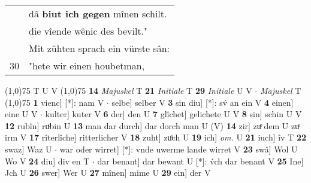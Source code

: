 \documentclass[8pt,a4paper,notitlepage]{article}
\begin{document}
\begin{table}[ht]
\begin{minipage}[t]{0.5\linewidth}
\begin{tabular}{rl}
 & dâ \textbf{biut ich gegen} mînen schilt.\\ 
 & die vîende wênic des bevilt."\\ 
 & Mit zühten sprach ein vürste sân:\\ 
30 & "hete wir einen houbetman,\\ 
\end{tabular}
\scriptsize
\line(1,0){75} \newline
T U V \newline
\line(1,0){75} \newline
\textbf{14} \textit{Majuskel} T  \textbf{21} \textit{Initiale} T  \textbf{29} \textit{Initiale} U V   $\cdot$ \textit{Majuskel} T  \newline
\line(1,0){75} \newline
\textbf{1} vienc] [*]: nam V  $\cdot$ selbe] selber V \textbf{3} sin diu] [*]: sv́ an ein V \textbf{4} einen] eine U V  $\cdot$ kulter] kuter V \textbf{6} der] den U \textbf{7} glîchet] gelichete U V \textbf{8} sin] schin U V \textbf{12} rubîn] ruͦbin U \textbf{13} man dar durch] dar dorch man U (V) \textbf{14} zir] zuͦ dem U zuͦ irm V \textbf{17} rîterlîche] ritterlicher V \textbf{18} zuht] zuͦch U \textbf{19} ich] \textit{om.} U \textbf{21} iuch] îv T \textbf{22} swaz] Waz U  $\cdot$ war oder wirret] [*]: vnde uwerme lande wirret V \textbf{23} swâ] Wol U Wo V \textbf{24} diu] div en T  $\cdot$ dar benant] dar bewant U [*]: v́ch dar benant V \textbf{25} Ine] Jch U \textbf{26} swer] Wer U \textbf{27} mînen] mime U \textbf{29} ein] der V \newline
\end{minipage}
\end{table}
\end{document}
